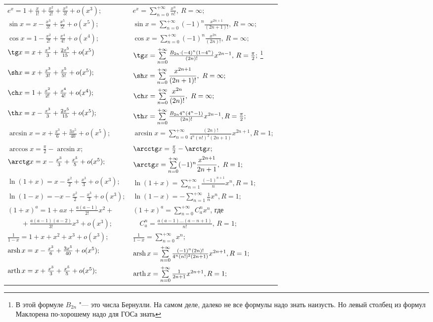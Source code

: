 \begin{longtable}[l]{ l l }
$e^x=1+\frac{x}{1!}+\frac{x^2}{2!}+\frac{x^3}{3!}+o(x^3);$
&
$e^x=\sum\limits_{n=0}^{+\infty}\displaystyle\frac{x^n}{n!},\ R=\infty;$
\\
$\sin x = x - \frac{x^3}{3!} + \frac{x^5}{5!}+o(x^5);$
&
$\sin x = \sum\limits_{n=0}^{+\infty} (-1)^{n}\displaystyle\frac{x^{2n+1}}{(2n+1)!},\, R=\infty;$
\\
$\cos x = 1 - \frac{x^2}{2!} + \frac{x^4}{4!}+o(x^4);$
&
$\cos x  = \sum\limits_{n=0}^{+\infty} (-1)^{n}\displaystyle\frac{x^{2n}}{(2n)!},\, R=\infty;$
\\
$\tg x = x + \frac{x^3}{3}+\frac{2x^5}{15}+o(x^5)$
&
$\tg x  = \sum\limits_{n=0}^{+\infty} \frac{B_{2n}\cdot (-4)^n (1-4^n)}{(2n)!} x^{2n-1},\, R=\frac{\pi}{2};$ \footnote{В этой формуле $B_{2n}$ "--- это числа Бернулли. На самом деле, далеко не все формулы надо знать наизусть. Но левый столбец из формул Маклорена по-хорошему надо для ГОСа знать}
\\ 
$\sh x = x +\frac{x^3}{3!}+\frac{x^5}{5!}+o(x^5);$
&
$\sh x =\sum\limits_{n=0}^{+\infty}\displaystyle\frac{x^{2n+1}}{(2n+1)!},\ R=\infty;$
\\
$\ch x = 1 + \frac{x^2}{2!}+\frac{x^4}{4!}+o(x^4);$
&
$\ch x  = \sum\limits_{n=0}^{+\infty}\displaystyle\frac{x^{2n}}{(2n)!},\ R=\infty;$
\\
$\th x = x - \frac{x^3}{3}+\frac{2x^5}{15}+o(x^5);$
&
$\th x  = \sum\limits_{n=0}^{+\infty} \frac{B_{2n} 4^n (4^n-1)}{(2n)!} x^{2n-1}, R=\frac{\pi}{2};$
\\
$\arcsin x = x + \frac{x^3}{6}+\frac{3x^5}{40}+o(x^5);$
&
$\arcsin x=\sum\limits_{n=0}^{+\infty} \frac{(2n)!}{4^n(n!)^2(2n + 1)}x^{2n + 1},  R = 1 ;$
\\
$\arccos x= \frac{\pi}{2} - \arcsin x;$
&
$\arcctg x = \frac{\pi}{2} - \arctg x;$
\\
$\arctg x = x - \frac{x^3}{3}+\frac{x^5}{5}+o(x^5);$
&
$\arctg x = \sum\limits_{n=0}^{+\infty} (-1)^n\displaystyle\frac{x^{2n+1}}{2n+1},\ R=1;$
\\
$\ln(1+x)=x-\frac{x^2}{2}+\frac{x^3}{3}+o(x^3);$
&
$\ln(1+x)= \sum\limits_{n=1}^{+\infty} \frac{(-1)^{n+1}}{n} x^n, R=1;$
\\
$\ln(1-x)=-x-\frac{x^2}{2}-\frac{x^3}{3}+o(x^3);$
&
$\ln(1-x)= -\sum\limits_{n=1}^{+\infty} \frac{1}{n} x^n, R=1;$
\\
$
(1+x)^{a}=1+ax+\displaystyle\frac{a(a-1)}{2!}x^2+
$
&
$(1+x)^{a}= \sum\limits_{n=0}^{+\infty} C^{n}_{a} x^n$, где
\\
$\qquad+\displaystyle\frac{a(a-1)(a-2)}{3!}x^3+o(x^3);$
&
$\quad C^{n}_{a}=\frac{a(a-1)\dots(a-n+1)}{n!},\, R=1;$
\\
$\frac{1}{1-x}=1+x+x^2+x^3+o(x^3);$
&
$\frac{1}{1-x}= \sum\limits_{n=0}^{+\infty} x^{n};$
\\
$\operatorname{arsh} x = x - \frac{x^3}{6}+\frac{3x^5}{40}+o(x^5);$
&
$\operatorname{arsh} x = \sum\limits_{n=0}^{+\infty} \frac{(-1)^n(2n)!}{4^n (n!)^2 (2n + 1)} x^{2n + 1}, R = 1;$
\\
$\operatorname{arth} x = x + \frac{x^3}{3}+\frac{x^5}{5}+o(x^5);$
&
$\operatorname{arth} x = \sum\limits_{n=0}^{+\infty} \frac{1}{2n + 1} x^{2n + 1}, R = 1;$
\end{longtable}

